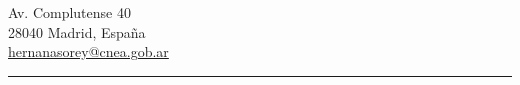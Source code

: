 \begin{minipage}[t]{0.40\textwidth}
	Av. Complutense 40\\
	28040 Madrid, España\\
	\href{mailto:hernanasorey@cnea.gob.ar}{hernanasorey@cnea.gob.ar}\\
\end{minipage}

\hrule

% 
% 
% 
